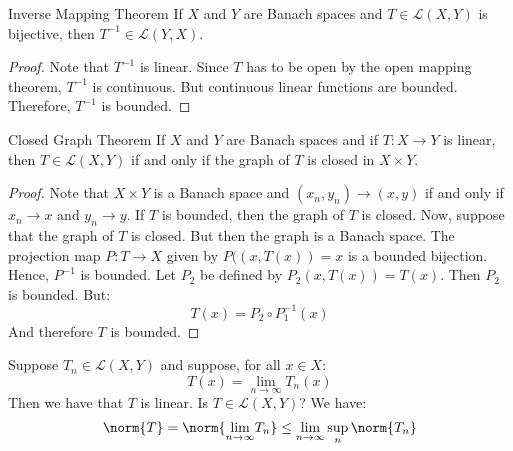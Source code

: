 \documentclass[crop=false,class=article,oneside]{standalone}
\begin{document}
        \begin{ltheorem}{Inverse Mapping Theorem}
            If $X$ and $Y$ are Banach spaces and
            $T\in\mathcal{L}(X,Y)$ is bijective, then
            $T^{\minus{1}}\in\mathcal{L}(Y,X)$.
        \end{ltheorem}
        \begin{proof}
            Note that $T^{\minus{1}}$ is linear. Since $T$ has to be
            open by the open mapping theorem, $T^{\minus{1}}$ is
            continuous. But continuous linear functions are bounded.
            Therefore, $T^{\minus{1}}$ is bounded.
        \end{proof}
        \begin{ltheorem}{Closed Graph Theorem}
            If $X$ and $Y$ are Banach spaces and if
            $T:X\rightarrow{Y}$ is linear, then
            $T\in\mathcal{L}(X,Y)$ if and only if the graph of
            $T$ is closed in $X\times{Y}$.
        \end{ltheorem}
        \begin{proof}
            Note that $X\times{Y}$ is a Banach space and
            $(x_{n},y_{n})\rightarrow(x,y)$ if and only if
            $x_{n}\rightarrow{x}$ and $y_{n}\rightarrow{y}$.
            If $T$ is bounded, then the graph of $T$ is closed.
            Now, suppose that the graph of $T$ is closed. But
            then the graph is a Banach space. The projection map
            $P:T\rightarrow{X}$ given by $P((x,T(x))=x$ is
            a bounded bijection. Hence, $P^{\minus{1}}$ is bounded.
            Let $P_{2}$ be defined by $P_{2}(x,T(x))=T(x)$. Then
            $P_{2}$ is bounded. But:
            \begin{equation}
                T(x)=P_{2}\circ{P}_{1}^{\minus{1}}(x)
            \end{equation}
            And therefore $T$ is bounded.
        \end{proof}
        \begin{lexample}
            Suppose $T_{n}\in\mathcal{L}(X,Y)$ and suppose, for
            all $x\in{X}$:
            \begin{equation}
                T(x)=\underset{n\rightarrow\infty}{\lim}T_{n}(x)
            \end{equation}
            Then we have that $T$ is linear. Is
            $T\in\mathcal{L}(X,Y)$? We have:
            \begin{equation}
                \norm{T}=
                \norm{\underset{n\rightarrow\infty}{\lim}T_{n}}
                \leq\underset{n\rightarrow\infty}{\lim}\sup_{n}
                \norm{T_{n}}
            \end{equation}
        \end{lexample}
\end{document}
